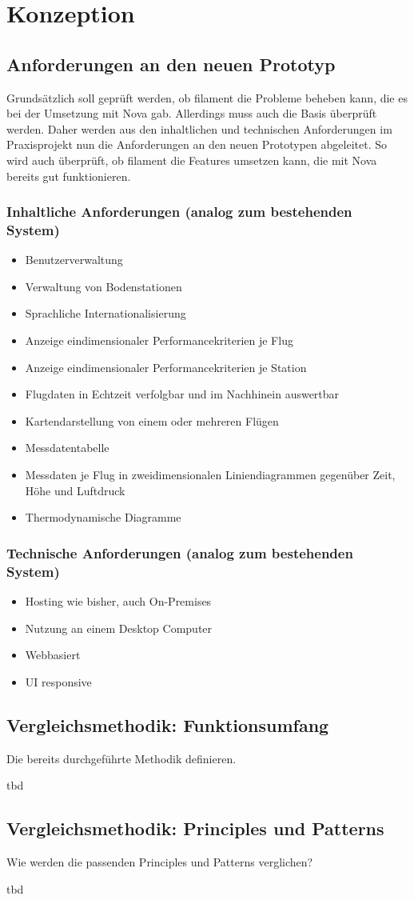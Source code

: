 \section{Konzeption}

\subsection{Anforderungen an den neuen Prototyp}

Grundsätzlich soll geprüft werden, ob filament die Probleme beheben kann, die es bei der Umsetzung mit Nova gab.
Allerdings muss auch die Basis überprüft werden.
Daher werden aus den inhaltlichen und technischen Anforderungen im Praxisprojekt nun die Anforderungen an den neuen Prototypen abgeleitet.
So wird auch überprüft, ob filament die Features umsetzen kann, die mit Nova bereits gut funktionieren.

\subsubsection{Inhaltliche Anforderungen (analog zum bestehenden System)}
\begin{itemize}
    \item Benutzerverwaltung
    \item Verwaltung von Bodenstationen
    \item Sprachliche Internationalisierung
    \item Anzeige eindimensionaler Performancekriterien je Flug
    \item Anzeige eindimensionaler Performancekriterien je Station
    \item Flugdaten in Echtzeit verfolgbar und im Nachhinein auswertbar
    \item Kartendarstellung von einem oder mehreren Flügen
    \item Messdatentabelle
    \item Messdaten je Flug in zweidimensionalen Liniendiagrammen gegenüber Zeit, Höhe und Luftdruck
    \item Thermodynamische Diagramme
\end{itemize}

\subsubsection{Technische Anforderungen (analog zum bestehenden System)}
\begin{itemize}
    \item Hosting wie bisher, auch On-Premises
    \item Nutzung an einem Desktop Computer
    \item Webbasiert
    \item UI responsive
\end{itemize}

\newpage

\subsection{Vergleichsmethodik: Funktionsumfang}
\color{red}
Die bereits durchgeführte Methodik definieren.

tbd
\color{black}

\subsection{Vergleichsmethodik: Principles und Patterns}
\color{red}
Wie werden die passenden Principles und Patterns verglichen?

tbd
\color{black}
